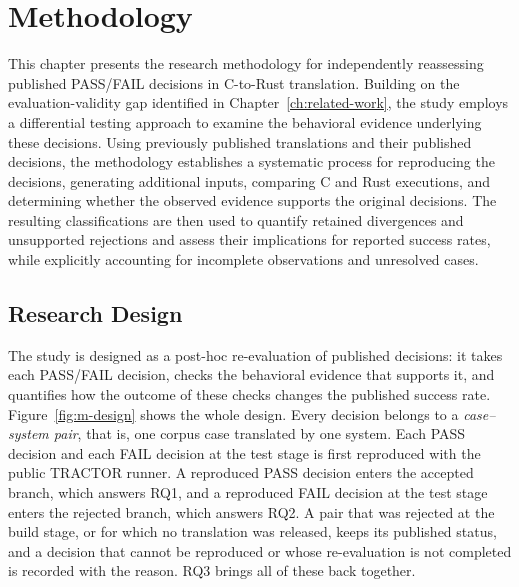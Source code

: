 \chapter{Methodology}\label{ch:methodology}

This chapter presents the research methodology for independently reassessing published PASS/FAIL decisions in C-to-Rust translation. Building on the evaluation-validity gap identified in Chapter~\ref{ch:related-work}, the study employs a differential testing approach to examine the behavioral evidence underlying these decisions. Using previously published translations and their published decisions, the methodology establishes a systematic process for reproducing the decisions, generating additional inputs, comparing C and Rust executions, and determining whether the observed evidence supports the original decisions. The resulting classifications are then used to quantify retained divergences and unsupported rejections and assess their implications for reported success rates, while explicitly accounting for incomplete observations and unresolved cases.

\section{Research Design}\label{sec:m-design}

The study is designed as a post-hoc re-evaluation of published decisions: it takes each PASS/FAIL decision, checks the behavioral evidence that supports it, and quantifies how the outcome of these checks changes the published success rate. Figure~\ref{fig:m-design} shows the whole design. Every decision belongs to a \emph{case--system pair}, that is, one corpus case translated by one system. Each PASS decision and each FAIL decision at the test stage is first reproduced with the public TRACTOR runner. A reproduced PASS decision enters the accepted branch, which answers RQ1, and a reproduced FAIL decision at the test stage enters the rejected branch, which answers RQ2. A pair that was rejected at the build stage, or for which no translation was released, keeps its published status, and a decision that cannot be reproduced or whose re-evaluation is not completed is recorded with the reason. RQ3 brings all of these back together.

